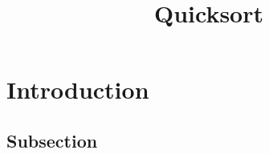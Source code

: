 \documentclass[]{finalproject}
\title{Quicksort}
\subtitle{}
\begin{document}
\maketitle

\section{Introduction} \label{introduction}

\subsection{Subsection}



\clearpage


\end{document}

